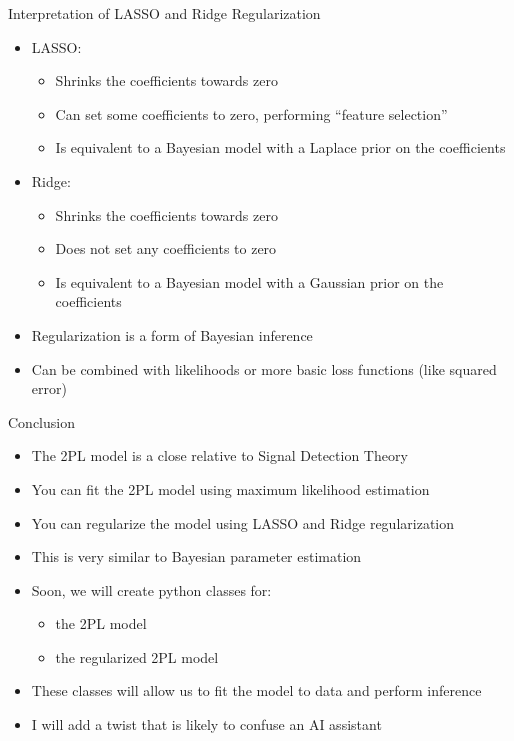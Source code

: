 \documentclass[aspectratio=169]{beamer}
\begin{document}
\begin{frame}{Interpretation of LASSO and Ridge Regularization}
  \begin{itemize}[<+->]
    \item LASSO:
    \begin{itemize}[<+->]
      \item Shrinks the coefficients towards zero
    \item Can set some coefficients to zero, performing ``feature selection''
    \item Is equivalent to a Bayesian model with a Laplace prior on the coefficients
    \end{itemize}
    \item Ridge:
    \begin{itemize}[<+->]
      \item Shrinks the coefficients towards zero
      \item Does not set any coefficients to zero
      \item Is equivalent to a Bayesian model with a Gaussian prior on the coefficients
    \end{itemize}
    \item Regularization is a form of Bayesian inference
    \item Can be combined with likelihoods or more basic loss functions (like squared error)
  \end{itemize}
\end{frame}

\begin{frame}{Conclusion}
  \begin{itemize}[<+->]
    \item The 2PL model is a close relative to Signal Detection Theory
    \item You can fit the 2PL model using maximum likelihood estimation
    \item You can regularize the model using LASSO and Ridge regularization
    \item This is very similar to Bayesian parameter estimation
    \item Soon, we will create python classes for:
    \begin{itemize}[<+->]
      \item the 2PL model
      \item the regularized 2PL model
    \end{itemize}
    \item These classes will allow us to fit the model to data and perform inference
    \item I will add a twist that is likely to confuse an AI assistant
  \end{itemize}
\end{frame}

\maketitle
\end{document}
